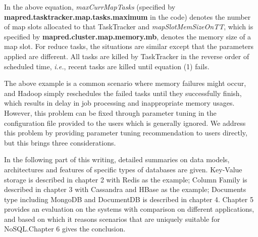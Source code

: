 In the above equation, \emph {maxCurrMapTasks} (specified by {\bf mapred.tasktracker.map.tasks.maximum} in the code) denotes the number of map slots allocated to that TaskTracker and \emph {mapSlotMemSizeOnTT}, which is specified by {\bf mapred.cluster.map.memory.mb}, denotes the memory size of a map slot. 
For reduce tasks, the situations are similar except that the parameters applied are different.
All tasks are killed by TaskTracker in the reverse order of scheduled time, \emph{i.e.}, recent tasks are killed until equation (1) fails. 
\par
The above example is a common scenario where memory failures might occur, and Hadoop simply reschedules the failed tasks until they successfully finish, which results in delay in job processing and inappropriate memory usages.
However, this problem can be fixed through parameter tuning in the configuration file provided to the users which is generally ignored.
We address this problem by providing parameter tuning recommendation to users directly, but this brings three considerations. 
\par

In the following part of this writing, detailed summaries on data models, architectures and features of specific types of databases are given. Key-Value storage is described in chapter 2 with Redis as the example; Column Family is described in chapter 3 with Cassandra and HBase as the example; Documents type including MongoDB and DocumentDB is described in chapter 4. Chapter 5 provides an evaluation on the systems with comparison on different applications, and based on which it reasons scenarios that are uniquely suitable for NoSQL.Chapter 6 gives the conclusion.


